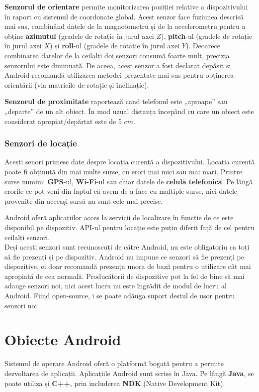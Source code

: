 \documentclass[12pt,a4paper]{article}
\begin{document}
\textbf{Senzorul de orientare} permite monitorizarea poziției relative a dispozitivului în raport cu sistemul de coordonate global. Acest senzor face fuziunea descrisă mai sus, combinând datele de la magnetometru și de la accelerometru pentru a obține \textbf{azimutul} (gradele de rotație în jurul axei $Z$), \textbf{pitch}-ul (gradele de rotație în jurul axei $X$) și \textbf{roll}-ul (gradele de rotație în jurul axei $Y$). Deoarece combinarea datelor de la ceilalți doi senzori consumă foarte mult, precizia senzorului este diminuată. De aceea, acest senzor a fost declarat depășit și Android recomandă utilizarea metodei prezentate mai sus pentru obținerea orientării (via matricile de rotație și înclinație).

\textbf{Senzorul de proximitate} raportează cand telefonul este „aproape” sau „departe” de un alt obiect. În mod uzual distanța începând cu care un obiect este considerat apropiat/depărtat este de 5 $cm$.

\subsubsection{Senzori de locație}
Acești senori primesc date despre locația curentă a dispozitivului. Locația curentă poate fi obținută din mai multe surse, cu erori mai mici sau mai mari. Printre surse numim: \textbf{GPS}-ul, \textbf{Wi-Fi}-ul sau chiar datele de \textbf{celulă telefonică}. Pe lângă erorile ce pot veni din faptul că avem de a face cu multiple surse, nici datele provenite din aceeași sursă nu sunt cele mai precise.

Android oferă aplicațiilor acces la servicii de localizare în funcție de ce este disponibil pe dispozitiv. API-ul pentru locație este puțin diferit față de cel pentru ceilalți senzori.\\

Deși acești senzori sunt recunoscuți de către Android, nu este obligatoriu ca toți să fie prezenți și pe dispozitiv. Android nu impune ce senzori să fie prezenți pe dispozitive, ei doar recomandă prezența unora de bază pentru o utilizare cât mai apropiată de cea normală. Producătorii de dispozitive pot la fel de bine să mai adauge senzori noi, nici acest lucru nu este îngrădit de modul de lucru al Android. Fiind open-source, i se poate adăuga suport destul de ușor pentru senzori noi.


\section{Obiecte Android}
Sistemul de operare Android oferă o platformă bogată pentru a permite dezvoltarea de aplicații. Aplicațiile Android sunt scrise în Java. Pe lângă \textbf{Java}, se poate utiliza și \textbf{C++}, prin includerea \textbf{NDK} (Native Development Kit).
\end{document}
